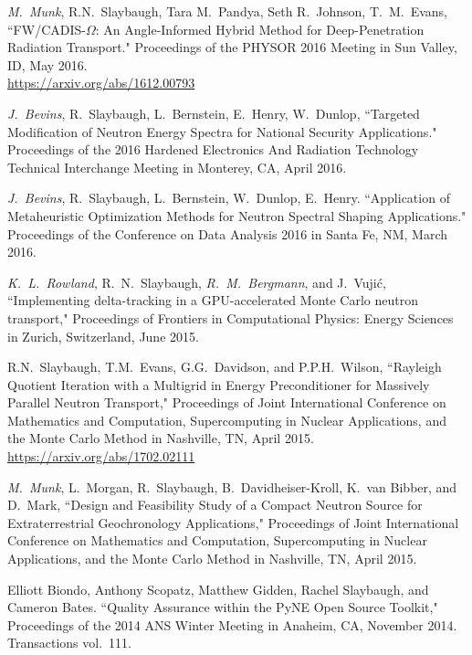 \begin{bibsection}
\item \textit{M.\ Munk}, R.N.\ Slaybaugh, Tara M.~Pandya, Seth R.~Johnson, T.~M.~Evans, ``FW/CADIS-$\Omega$: An Angle-Informed Hybrid Method for Deep-Penetration Radiation Transport." Proceedings of the PHYSOR 2016 Meeting in Sun Valley, ID, May 2016.\\
\url{https://arxiv.org/abs/1612.00793}

\item \textit{J.\ Bevins}, R.\ Slaybaugh, L.\ Bernstein, E.\ Henry, W.\ Dunlop, ``Targeted Modification of Neutron Energy Spectra for National Security Applications." Proceedings of the 2016 Hardened Electronics And Radiation Technology Technical Interchange Meeting in Monterey, CA, April 2016. 

\item \textit{J.\ Bevins}, R.\ Slaybaugh, L.\ Bernstein, W.\ Dunlop, E.\ Henry. ``Application of Metaheuristic Optimization Methods for Neutron Spectral Shaping Applications." Proceedings of the Conference on Data Analysis 2016 in Santa Fe, NM, March 2016. 

\item \textit{K.\ L.\ Rowland}, R.\ N.\ Slaybaugh, \textit{R.\ M.\ Bergmann}, and J.\ Vuji\'c, ``Implementing delta-tracking in a GPU-accelerated Monte Carlo neutron transport," Proceedings of Frontiers in Computational Physics: Energy Sciences in Zurich, Switzerland, June 2015. 

\item  R.N.\ Slaybaugh, T.M.\ Evans, G.G.\ Davidson, and P.P.H.\ Wilson, ``Rayleigh Quotient Iteration with a Multigrid in Energy Preconditioner for Massively Parallel Neutron Transport," Proceedings of Joint International Conference on Mathematics and Computation, Supercomputing in Nuclear Applications, and the Monte Carlo Method in Nashville, TN, April 2015.\\
\url{https://arxiv.org/abs/1702.02111}

\item  \textit{M.\ Munk}, L.\ Morgan, R.\ Slaybaugh, B.\ Davidheiser-Kroll, K.\ van Bibber, and D.\ Mark, ``Design and Feasibility Study of a Compact Neutron Source for Extraterrestrial Geochronology Applications," Proceedings of Joint International Conference on Mathematics and Computation, Supercomputing in Nuclear Applications, and the Monte Carlo Method in Nashville, TN, April 2015.

\item Elliott Biondo, Anthony Scopatz, Matthew Gidden, Rachel Slaybaugh, and Cameron Bates. ``Quality Assurance within the PyNE Open Source Toolkit,"  Proceedings of the 2014 ANS Winter Meeting in Anaheim, CA, November 2014. Transactions vol.\ 111.


\end{bibsection}
